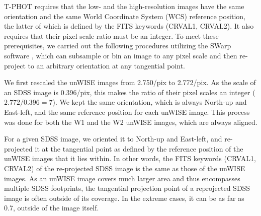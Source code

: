 \documentclass[apj,iop]{emulateapj}
\begin{document}

T-PHOT requires that the low- and the high-resolution images have the same orientation and the same World Coordinate System (WCS) reference position, the latter of which is defined by the FITS keywords (CRVAL1, CRVAL2). %
It also requires that their pixel scale ratio must be an integer. To meet these prerequisites, we carried out the following procedures utilizing the SWarp software \citep[][]{Bertin2002}, which can subsample or bin an image to any pixel scale and then re-project to an arbitrary orientation at any tangential point.

We first rescaled the unWISE images from 2.750\arcsec/pix to 2.772\arcsec/pix. As the scale of an SDSS image is 0.396\arcsec/pix, this makes the ratio of their pixel scales an integer ($2.772/0.396=7$). We kept the same orientation, which is always North-up and East-left, and the same reference position for each unWISE image. This process was done for both the W1 and the W2 unWISE images, which are always aligned.

For a given SDSS image, we oriented it to North-up and East-left, and re-projected it at the tangential point as defined by the reference position of the unWISE images that it lies within. In other words, the FITS keywords (CRVAL1, CRVAL2) of the re-projected SDSS image is the same as those of the unWISE images. As an unWISE image covers much larger area and thus encompasses multiple SDSS footprints, the tangential projection point of a reprojected SDSS image is often outside of its coverage. In the extreme cases, it can be as far as 0.7\degree, outside of the image itself.
\end{document}
